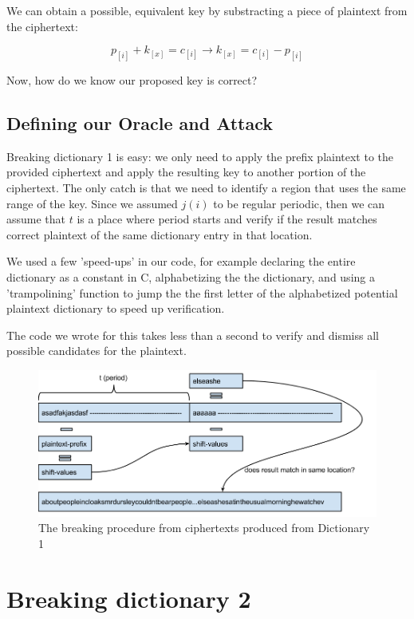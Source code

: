 \documentclass[pdftex,12pt,letter]{article}
\begin{document}
We can obtain a possible, equivalent key by substracting a piece of plaintext from the
ciphertext:

\begin{equation}
    p_{[i]} + k_{[x]} = c_{[i]} \rightarrow k_{[x]} = c_{[i]} - p_{[i]}
\end{equation}

Now, how do we know our proposed key is correct?

\subsection{Defining our Oracle and Attack}

Breaking dictionary 1 is easy: we only need to apply the prefix plaintext to
the provided ciphertext and apply the resulting  key to another portion of
the ciphertext. The only catch is that we need to identify a region that uses
the same range of the key. Since we assumed $j(i)$ to be regular periodic, then
we can assume that $t$ is a place where period starts and verify if the result
matches correct plaintext of the same dictionary entry in that location. 

We used a few 'speed-ups' in our code, for example declaring the entire
dictionary as a constant in C, alphabetizing the the dictionary, and 
using a 'trampolining' function to jump the the first letter of the
alphabetized potential plaintext dictionary to speed up verification.  

The code we wrote for this takes less than a second to verify and dismiss all
possible candidates for the plaintext. 

\begin{figure}[ht!]
    \centering
    \includegraphics[width=.8\textwidth]{breaking-dict1}
    \caption{The breaking procedure from ciphertexts produced from Dictionary 1}
    \label{breaking-dict1}
\end{figure}

\section{Breaking dictionary 2}
\end{document}
